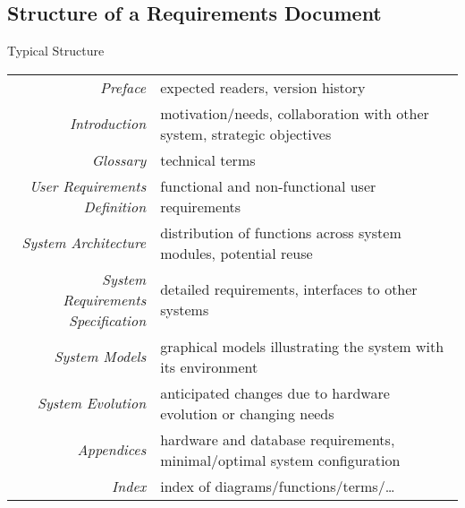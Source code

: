 \subsection{Structure of a Requirements Document}
\begin{frame}{\insertsubsection}
	\begin{definition}{Typical Structure \mysource{\sommerville}}
		\setlength\tabcolsep{1mm}
		\begin{tabularx}{\textwidth}{rX}
			\emph{Preface} & expected readers, version history\\
			\emph{Introduction} &  motivation/needs, collaboration with other system, strategic objectives\\
			\emph{Glossary} & technical terms\\
			\emph{User Requirements Definition} & functional and non-functional user requirements\\
			\emph{System Architecture} & distribution of functions across system modules, potential reuse\\
			\emph{System Requirements Specification} & detailed requirements, interfaces to other systems\\
			\emph{System Models} & graphical models illustrating the system with its environment\\
			\emph{System Evolution} & anticipated changes due to hardware evolution or changing needs\\
			\emph{Appendices} & hardware and database requirements, minimal/optimal system configuration\\
			\emph{Index} & index of diagrams/functions/terms/\ldots
		\end{tabularx}
	\end{definition}
\end{frame}
